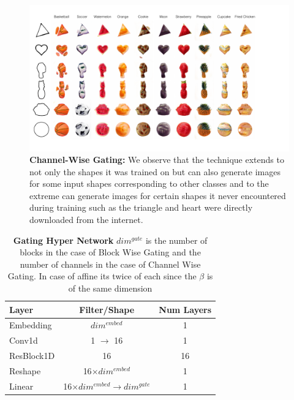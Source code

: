 \documentclass[10pt,twocolumn,letterpaper]{article}
\begin{document}
\begin{figure}[t]
    \centering
    \includegraphics[width=\linewidth,trim={0 0 4.5cm 0},clip]{paper_images/supplementary_grid_channel.pdf}
    \caption{{\bf Channel-Wise Gating:} We observe that the technique extends to not only the shapes it was trained on but can also generate images for some input shapes corresponding to other classes and to the extreme can generate images for certain shapes it never encountered during training such as the triangle and heart were directly downloaded from the internet. }
    \label{fig:channel_shapes}
    \vspace{-3mm}
\end{figure}


\begin{table}[ht]
\caption{\textbf{Gating Hyper Network} $dim^{gate}$ is the number of blocks in the case of Block Wise Gating and the number of channels in the case of Channel Wise Gating. In case of affine its twice of each since the $\beta$ is of the same dimension }
\centering %
\begin{tabular}{l c c} %
\toprule%
\textbf{Layer} & \textbf{Filter/Shape} & \textbf{Num Layers} \\
\midrule
Embedding & $dim^{embed}$ & 1 \\
Conv1d & 1 $\rightarrow$ 16 & 1\\
ResBlock1D & 16 & 16\\
Reshape & 16$\times dim^{embed}$ & 1\\
Linear & 16$\times dim^{embed} \rightarrow dim^{gate} $& 1\\
\bottomrule%
\end{tabular}
\label{table:resnet_gating} %
\end{table}
\end{document}
